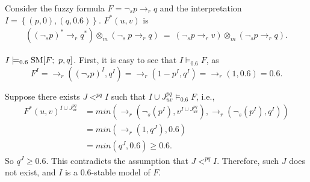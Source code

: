 \documentclass[runningheads]{llncs}
\def\ba{\begin{array}}
\def\ea{\end{array}}
\def\sm{\hbox{\rm SM}}
\def\rar{\rightarrow}
\def\fand{\otimes}
\begin{document}
\begin{example}\label{ex:not_p_implies_q}
Consider the fuzzy formula $F = \neg_{\!s} p \rar_r q$ and the interpretation 
$I = \left\{(p, 0), (q, 0.6)\right\}$.  
$F^*(u,v)$ is  
\[
\ba {rl}
   ((\neg_{\!s} p)^* \rar_{r} q^*)\fand_m(\neg_{\!s}\ p \rar_r q)\ 
   =\ (\neg_{\!s} p \rar_r v)\fand_m(\neg_{\!s} p \rar_r q). 
\ea
\]

$I\models_{0.6} \sm[F;\ p,q]$. First, it is easy to see that 
$I\models_{0.6} F$, as 
\[  F^I = \rar_r((\neg_{\!s} p)^I, q^I) = \rar_r(1 -p^I, q^I) = \rar_r(1,
0.6) = 0.6.
\]

Suppose there exists $J<^{pq} I$ such that $I \cup J_{uv}^{pq}
\models_{0.6} F$, i.e.,
\[ 
\ba {rl} 
   F^*(u,v)^{I\cup J_{uv}^{pq}} 
   &= min\left(\rar_r(\neg_{\!s}(p^I), v^{I \cup J_{uv}^{pq}}),
               \rar_r(\neg_{\!s}(p^I), q^I)\right) \\
   &= min\left(\rar_r(1, q^J), 0.6\right) \\
   &= min\left(q^J, 0.6\right) \geq 0.6. 
\ea
\]
So $q^J\geq 0.6$. 
This contradicts the assumption that $J <^{pq} I$. Therefore, such $J$
does not exist, and $I$ is a 0.6-stable model of $F$.
\end{example}
\end{document}
